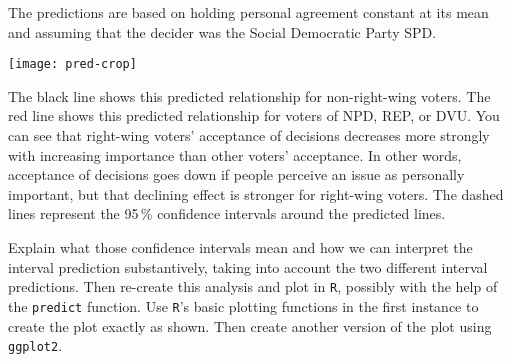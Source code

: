 \documentclass[a4paper,11pt]{article}
\begin{document}
The predictions are based on holding personal agreement constant at its mean and assuming that the decider was the Social Democratic Party SPD.
\begin{center}
 \texttt{[image: pred-crop]}
\end{center}
The black line shows this predicted relationship for non-right-wing voters. The red line shows this predicted relationship for voters of NPD, REP, or DVU. You can see that right-wing voters' acceptance of decisions decreases more strongly with increasing importance than other voters' acceptance. In other words, acceptance of decisions goes down if people perceive an issue as personally important, but that declining effect is stronger for right-wing voters. The dashed lines represent the 95\,\% confidence intervals around the predicted lines.

Explain what those confidence intervals mean and how we can interpret the interval prediction substantively, taking into account the two different interval predictions. Then re-create this analysis and plot in \texttt{R}, possibly with the help of the \texttt{predict} function. Use \texttt{R}'s basic plotting functions in the first instance to create the plot exactly as shown. Then create another version of the plot using \texttt{ggplot2}.
\end{document}
